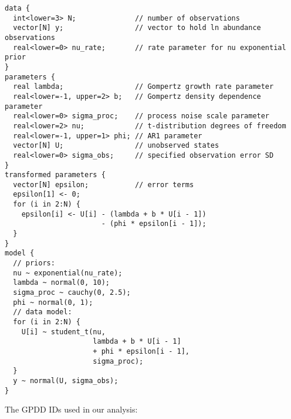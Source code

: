 \documentclass[12pt]{article}
\begin{document}
\begin{spacing}{1.15}
\begin{footnotesize}
\begin{verbatim}
data {
  int<lower=3> N;              // number of observations
  vector[N] y;                 // vector to hold ln abundance observations
  real<lower=0> nu_rate;       // rate parameter for nu exponential prior
}
parameters {
  real lambda;                 // Gompertz growth rate parameter
  real<lower=-1, upper=2> b;   // Gompertz density dependence parameter
  real<lower=0> sigma_proc;    // process noise scale parameter
  real<lower=2> nu;            // t-distribution degrees of freedom
  real<lower=-1, upper=1> phi; // AR1 parameter
  vector[N] U;                 // unobserved states
  real<lower=0> sigma_obs;     // specified observation error SD
}
transformed parameters {
  vector[N] epsilon;           // error terms
  epsilon[1] <- 0;
  for (i in 2:N) {
    epsilon[i] <- U[i] - (lambda + b * U[i - 1])
                       - (phi * epsilon[i - 1]);
  }
}
model {
  // priors:
  nu ~ exponential(nu_rate);
  lambda ~ normal(0, 10);
  sigma_proc ~ cauchy(0, 2.5);
  phi ~ normal(0, 1);
  // data model:
  for (i in 2:N) {
    U[i] ~ student_t(nu,
                     lambda + b * U[i - 1]
                     + phi * epsilon[i - 1],
                     sigma_proc);
  }
  y ~ normal(U, sigma_obs);
}
\end{verbatim}
\end{footnotesize}

\clearpage

\noindent
The GPDD IDs used in our analysis:

\begin{footnotesize}
\noindent
{\tt

}
\end{footnotesize}
\end{spacing}
\end{document}
